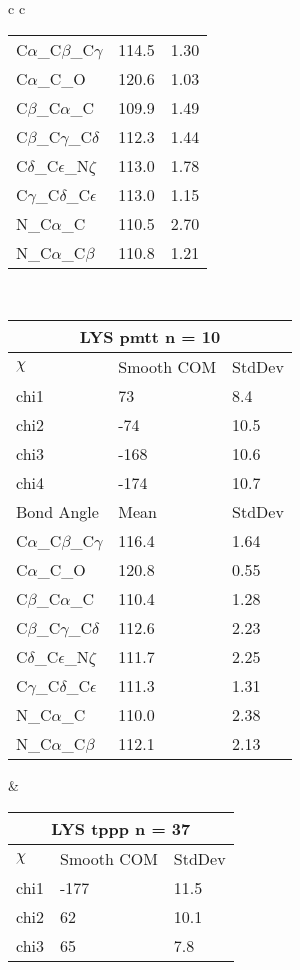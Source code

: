 \begin{longtable}{ c c }
\begin{tabular}{ l l l }
  C$\alpha$\_C$\beta$\_C$\gamma$ & 114.5 & 1.30\\
  C$\alpha$\_C\_O & 120.6 & 1.03\\
  C$\beta$\_C$\alpha$\_C & 109.9 & 1.49\\
  C$\beta$\_C$\gamma$\_C$\delta$ & 112.3 & 1.44\\
  C$\delta$\_C$\epsilon$\_N$\zeta$ & 113.0 & 1.78\\
  C$\gamma$\_C$\delta$\_C$\epsilon$ & 113.0 & 1.15\\
  N\_C$\alpha$\_C & 110.5 & 2.70\\
  N\_C$\alpha$\_C$\beta$ & 110.8 & 1.21\\
  \bottomrule
  \end{tabular}
  \\
  \begin{tabular}{ l l l }
  \toprule
  \multicolumn{3}{c}{LYS \textbf{pmtt} n = 10} \\ \toprule
  $\chi$       & Smooth COM & StdDev \\ \midrule
  chi1 & 73 & 8.4 \\ 
  chi2 & -74 & 10.5 \\ 
  chi3 & -168 & 10.6 \\ 
  chi4 & -174 & 10.7 \\ \midrule
  Bond Angle   & Mean     & StdDev \\ \midrule
  C$\alpha$\_C$\beta$\_C$\gamma$ & 116.4 & 1.64\\
  C$\alpha$\_C\_O & 120.8 & 0.55\\
  C$\beta$\_C$\alpha$\_C & 110.4 & 1.28\\
  C$\beta$\_C$\gamma$\_C$\delta$ & 112.6 & 2.23\\
  C$\delta$\_C$\epsilon$\_N$\zeta$ & 111.7 & 2.25\\
  C$\gamma$\_C$\delta$\_C$\epsilon$ & 111.3 & 1.31\\
  N\_C$\alpha$\_C & 110.0 & 2.38\\
  N\_C$\alpha$\_C$\beta$ & 112.1 & 2.13\\
  \bottomrule
  \end{tabular}
  &
  \begin{tabular}{ l l l }
  \toprule
  \multicolumn{3}{c}{LYS \textbf{tppp} n = 37} \\ \toprule
  $\chi$       & Smooth COM & StdDev \\ \midrule
  chi1 & -177 & 11.5 \\ 
  chi2 & 62 & 10.1 \\ 
  chi3 & 65 & 7.8 \\ 

\end{tabular}
\end{longtable}
